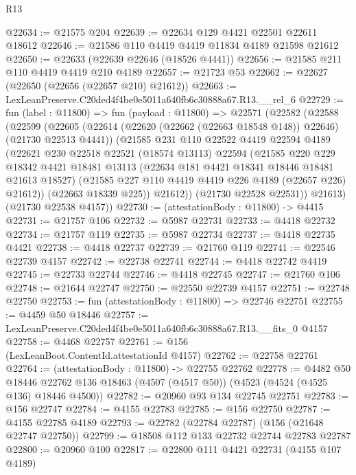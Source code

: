 \begin{lexlean}{R13}
\begin{coremodule}
@22634 := @21575 @204
@22639 := @22634 @129 @4421 @22501 @22611 @18612
@22646 := @21586 @110 @4419 @4419 @11834 @4189 @21598 @21612
@22650 := @22633 (@22639 @22646 (@18526 @4441))
@22656 := @21585 @211 @110 @4419 @4419 @210 @4189
@22657 := @21723 @53
@22662 := @22627 (@22650 (@22656 (@22657 @210) @21612))
@22663 := LexLeanPreserve.C20ded4f4be0e5011a640fb6c30888a67.R13.__rel_6
@22729 := fun (label : @11800) =>
  fun (payload : @11800) =>
  @22571
    (@22582
      (@22588
        (@22599
          (@22605
            (@22614 (@22620 (@22662 (@22663 @18548 @148)) @22646) (@21730 @22513 @4441))
            (@21585
              @231
              @110
              @22522
              @4419
              @22594
              @4189
              (@22621
                @230
                @22518
                @22521
                (@18574 @13113)
                @22594
                (@21585
                  @220
                  @229
                  @18342
                  @4421
                  @18481
                  @13113
                  (@22634 @181 @4421 @18341 @18446 @18481 @21613 @18527)
                  (@21585 @227 @110 @4419 @4419 @226 @4189 (@22657 @226) @21612))
                (@22663 @18339 @225))
              @21612))
          (@21730 @22528 @22531))
        @21613)
      (@21730 @22538 @4157))
@22730 := (attestationBody : @11800) -> @4415
@22731 := @21757 @106
@22732 := @5987 @22731
@22733 := @4418 @22732
@22734 := @21757 @119
@22735 := @5987 @22734
@22737 := @4418 @22735 @4421
@22738 := @4418 @22737
@22739 := @21760 @119
@22741 := @22546 @22739 @4157
@22742 := @22738 @22741
@22744 := @4418 @22742 @4419
@22745 := @22733 @22744
@22746 := @4418 @22745
@22747 := @21760 @106
@22748 := @21644 @22747
@22750 := @22550 @22739 @4157
@22751 := @22748 @22750
@22753 := fun (attestationBody : @11800) => @22746 @22751
@22755 := @4459 @50 @18446
@22757 := LexLeanPreserve.C20ded4f4be0e5011a640fb6c30888a67.R13.__fits_0 @4157
@22758 := @4468 @22757
@22761 := @156 (LexLeanBoot.ContentId.attestationId @4157)
@22762 := @22758 @22761
@22764 := (attestationBody : @11800) -> @22755 @22762
@22778 := @4482
    @50
    @18446
    @22762
    @136
    @18463
    (@4507 (@4517 @50))
    (@4523 (@4524 (@4525 @136) @18446 @4500))
@22782 := @20960 @93 @134 @22745 @22751
@22783 := @156 @22747
@22784 := @4155 @22783
@22785 := @156 @22750
@22787 := @4155 @22785 @4189
@22793 := @22782 (@22784 @22787) (@156 (@21648 @22747 @22750))
@22799 := @18508 @112 @133 @22732 @22744 @22783 @22787
@22800 := @20960 @100
@22817 := @22800
    @111
    @4421
    @22731
    (@4155 @107 @4189)

\end{coremodule}
\end{lexlean}
